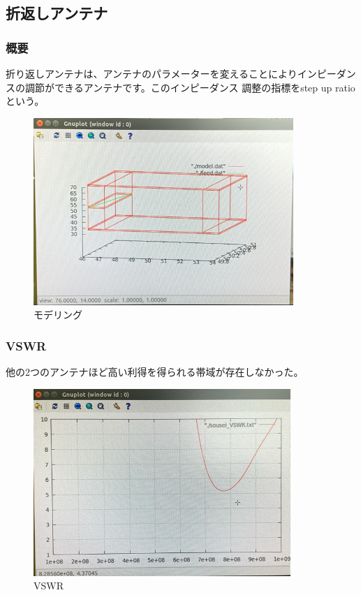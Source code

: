 \documentclass[dvipdfmx,autodetect-engine,titlepage]{jsarticle}
\begin{document}
\subsection{折返しアンテナ}
\subsubsection{概要}
折り返しアンテナは、アンテナのパラメーターを変えることによりインピーダンスの調節ができるアンテナです。このインピーダンス
調整の指標をstep up ratioという。\\
\begin{figure}[H]
  \centering
  \includegraphics[scale=0.6]{o1.png}
  \caption{モデリング}\label{fig:図16}
\end{figure}

\subsubsection{VSWR}
他の2つのアンテナほど高い利得を得られる帯域が存在しなかった。\\
\begin{figure}[H]
  \centering
  \includegraphics[scale=0.6]{o2.png}
  \caption{VSWR}\label{fig:図17}
\end{figure}
\end{document}
